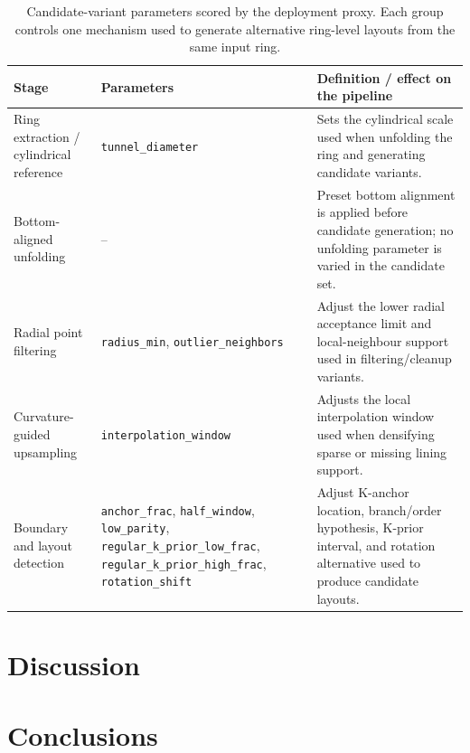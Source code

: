 \documentclass[a4paper,fleqn]{cas-dc}
\begin{document}
{\begin{table}[t]
\caption{
Candidate-variant parameters scored by the deployment proxy.
Each group controls one mechanism used to generate alternative ring-level layouts from the same input ring.
}
\label{tab:workflow_critical_parameters}
\centering
\footnotesize
\begin{tabular}{p{}p{}p{}}
\toprule
Stage & Parameters & Definition / effect on the pipeline \\
\midrule
Ring extraction / cylindrical reference
& \texttt{tunnel\_diameter}
& Sets the cylindrical scale used when unfolding the ring and generating candidate variants. \\
\addlinespace
Bottom-aligned unfolding
& --
& Preset bottom alignment is applied before candidate generation; no unfolding parameter is varied in the candidate set. \\
\addlinespace
Radial point filtering
& \texttt{radius\_min}, \texttt{outlier\_neighbors}
& Adjust the lower radial acceptance limit and local-neighbour support used in filtering/cleanup variants. \\
\addlinespace
Curvature-guided upsampling
& \texttt{interpolation\_window}
& Adjusts the local interpolation window used when densifying sparse or missing lining support. \\
\addlinespace
Boundary and layout detection
& \texttt{anchor\_frac}, \texttt{half\_window}, \texttt{low\_parity}, \texttt{regular\_k\_prior\_low\_frac}, \texttt{regular\_k\_prior\_high\_frac}, \texttt{rotation\_shift}
& Adjust K-anchor location, branch/order hypothesis, K-prior interval, and rotation alternative used to produce candidate layouts. \\
\bottomrule
\end{tabular}
\end{table}
\section{Discussion}\label{sec:discussion}

\section{Conclusions}\label{sec:conclusions}

}
\end{document}
